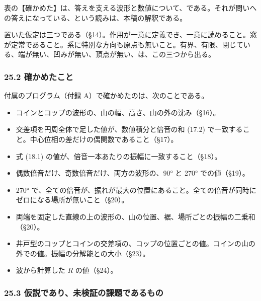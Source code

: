 \documentclass[
  a4paper,
]{ltjsarticle}
\providecommand{\tightlist}{%
  \setlength{\itemsep}{0pt}\setlength{\parskip}{0pt}}
\begin{document}
表の【確かめた】は、答えを支える波形と数値について、である。それが問いへの答えになっている、という読みは、本稿の解釈である。

置いた仮定は三つである（§14）。作用が一意に定義でき、一意に読めること。窓が定常であること。系に特別な方向も原点も無いこと。有界、有限、閉じている、端が無い、凹みが無い、頂点が無い、は、この三つから出る。

\subsubsection{25.2
確かめたこと}\label{ux78baux304bux3081ux305fux3053ux3068}

付属のプログラム（付録 A）で確かめたのは、次のことである。

\begin{itemize}
\tightlist
\item
  コインとコップの波形の、山の幅、高さ、山の外の沈み（§16）。
\item
  交差項を円周全体で足した値が、数値積分と倍音の和 (17.2)
  で一致すること。中心位相の差だけの偶関数であること（§17）。
\item
  式 (18.1) の値が、倍音一本あたりの振幅に一致すること（§18）。
\item
  偶数倍音だけ、奇数倍音だけ、両方の波形の、90° と 270° での値（§19）。
\item
  270°
  で、全ての倍音が、振れが最大の位置にあること。全ての倍音が同時にゼロになる場所が無いこと（§20）。
\item
  両端を固定した直線の上の波形の、山の位置、裾、場所ごとの振幅の二乗和（§20）。
\item
  井戸型のコップとコインの交差項の、コップの位置ごとの値。コインの山の外での値。振幅の分解能との大小（§23）。
\item
  波から計算した \(R\) の値（§24）。
\end{itemize}

\subsubsection{25.3
仮説であり、未検証の課題であるもの}\label{ux4eeeux8aacux3067ux3042ux308aux672aux691cux8a3cux306eux8ab2ux984cux3067ux3042ux308bux3082ux306e}
\end{document}
